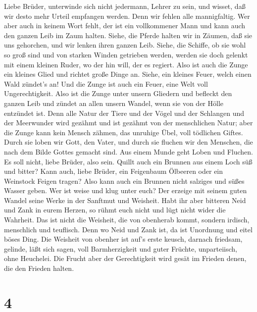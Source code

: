  Liebe Brüder, unterwinde sich nicht jedermann, Lehrer zu
sein, und wisset, daß wir desto mehr Urteil empfangen werden.
 Denn wir fehlen alle mannigfaltig. Wer aber auch in keinem
Wort fehlt, der ist ein vollkommener Mann und kann auch den ganzen Leib
im Zaum halten.  Siehe, die Pferde halten wir in Zäumen, daß
sie uns gehorchen, und wir lenken ihren ganzen Leib.  Siehe,
die Schiffe, ob sie wohl so groß sind und von starken Winden getrieben
werden, werden sie doch gelenkt mit einem kleinen Ruder, wo der hin
will, der es regiert.  Also ist auch die Zunge ein kleines
Glied und richtet große Dinge an. Siehe, ein kleines Feuer, welch einen
Wald zündet's an!  Und die Zunge ist auch ein Feuer, eine
Welt voll Ungerechtigkeit. Also ist die Zunge unter unsern Gliedern und
befleckt den ganzen Leib und zündet an allen unsern Wandel, wenn sie von
der Hölle entzündet ist.  Denn alle Natur der Tiere und der
Vögel und der Schlangen und der Meerwunder wird gezähmt und ist gezähmt
von der menschlichen Natur;  aber die Zunge kann kein Mensch
zähmen, das unruhige Übel, voll tödlichen Giftes.  Durch sie
loben wir Gott, den Vater, und durch sie fluchen wir den Menschen, die
nach dem Bilde Gottes gemacht sind.  Aus einem Munde geht
Loben und Fluchen. Es soll nicht, liebe Brüder, also sein. 
Quillt auch ein Brunnen aus einem Loch süß und bitter? 
Kann auch, liebe Brüder, ein Feigenbaum Ölbeeren oder ein Weinstock
Feigen tragen? Also kann auch ein Brunnen nicht salziges und süßes
Wasser geben.  Wer ist weise und klug unter euch? Der
erzeige mit seinem guten Wandel seine Werke in der Sanftmut und
Weisheit.  Habt ihr aber bitteren Neid und Zank in eurem
Herzen, so rühmt euch nicht und lügt nicht wider die Wahrheit.
 Das ist nicht die Weisheit, die von obenherab kommt,
sondern irdisch, menschlich und teuflisch.  Denn wo Neid
und Zank ist, da ist Unordnung und eitel böses Ding.  Die
Weisheit von obenher ist auf's erste keusch, darnach friedsam, gelinde,
läßt sich sagen, voll Barmherzigkeit und guter Früchte, unparteiisch,
ohne Heuchelei.  Die Frucht aber der Gerechtigkeit wird
gesät im Frieden denen, die den Frieden halten.

\hypertarget{section-3}{%
\section{4}\label{section-3}}

